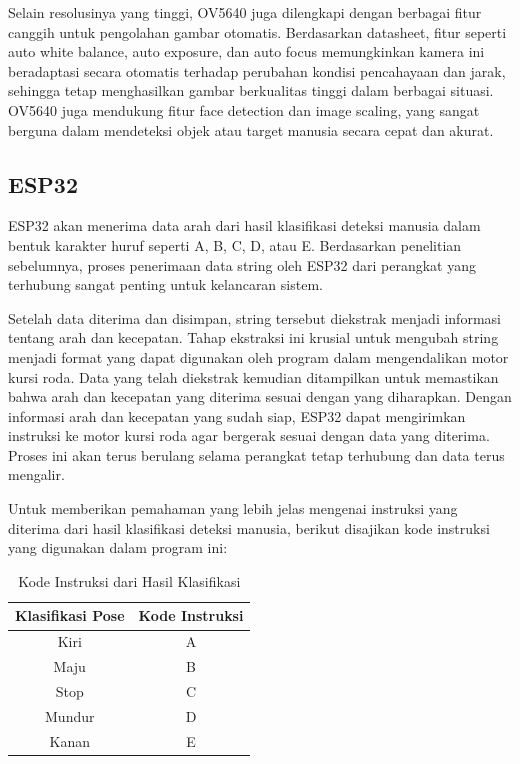 Selain resolusinya yang tinggi, OV5640 juga dilengkapi dengan berbagai fitur canggih untuk pengolahan gambar otomatis. Berdasarkan datasheet, fitur seperti auto white balance, auto exposure, dan auto focus memungkinkan kamera ini beradaptasi secara otomatis terhadap perubahan kondisi pencahayaan dan jarak, sehingga tetap menghasilkan gambar berkualitas tinggi dalam berbagai situasi. OV5640 juga mendukung fitur face detection dan image scaling, yang sangat berguna dalam mendeteksi objek atau target manusia secara cepat dan akurat.

\subsection{ESP32}
\label{subsec:ESP32}
ESP32 akan menerima data arah dari hasil klasifikasi deteksi manusia dalam bentuk karakter huruf seperti A, B, C, D, atau E. Berdasarkan penelitian sebelumnya, proses penerimaan data string oleh ESP32 dari perangkat yang terhubung sangat penting untuk kelancaran sistem.

Setelah data diterima dan disimpan, string tersebut diekstrak menjadi informasi tentang arah dan kecepatan. Tahap ekstraksi ini krusial untuk mengubah string menjadi format yang dapat digunakan oleh program dalam mengendalikan motor kursi roda. Data yang telah diekstrak kemudian ditampilkan untuk memastikan bahwa arah dan kecepatan yang diterima sesuai dengan yang diharapkan. Dengan informasi arah dan kecepatan yang sudah siap, ESP32 dapat mengirimkan instruksi ke motor kursi roda agar bergerak sesuai dengan data yang diterima. Proses ini akan terus berulang selama perangkat tetap terhubung dan data terus mengalir.

Untuk memberikan pemahaman yang lebih jelas mengenai instruksi yang diterima dari hasil klasifikasi deteksi manusia, berikut disajikan kode instruksi yang digunakan dalam program ini:
\begin{table}[H]
\centering
\caption{Kode Instruksi dari Hasil Klasifikasi}
\begin{tabular}{|c|c|}
\hline
\textbf{Klasifikasi Pose} & \textbf{Kode Instruksi} \\
\hline
Kiri & A \\
\hline
Maju & B \\
\hline
Stop & C \\
\hline
Mundur & D \\
\hline
Kanan & E \\
\hline
\end{tabular}
\end{table}

